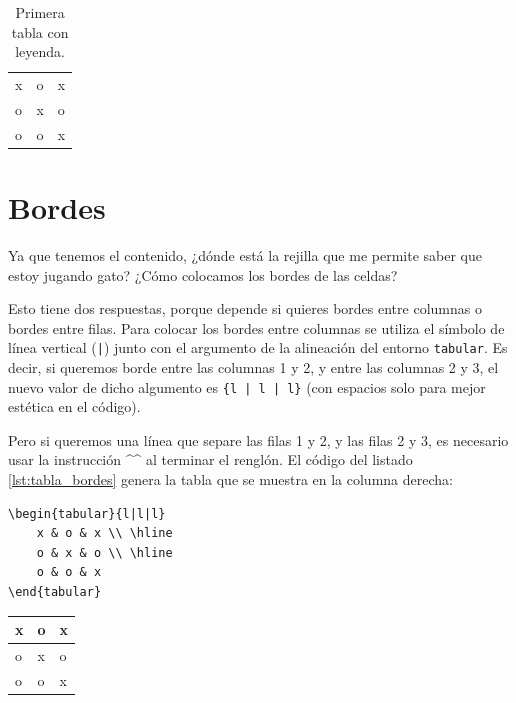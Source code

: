 \begin{table}[ht!]
	\centering
	\begin{tabular}{lll}
		x & o & x \\
		o & x & o \\
		o & o & x
	\end{tabular}
	\caption{Primera tabla con leyenda.}
	\label{tab:primera_tabla_leyenda}
\end{table}



\section{Bordes}
\label{sec:bordes}



Ya que tenemos el contenido, ¿dónde está la rejilla que me permite saber que estoy jugando gato? ¿Cómo colocamos los bordes de las celdas?

Esto tiene dos respuestas, porque depende si quieres bordes entre columnas o bordes entre filas. Para colocar los bordes entre columnas se utiliza el símbolo de línea vertical (\texttt{|}) junto con el argumento de la alineación del entorno \texttt{tabular}. Es decir, si queremos borde entre las columnas 1 y 2, y entre las columnas 2 y 3, el nuevo valor de dicho algumento es \texttt{\{l | l | l\}} (con espacios solo para mejor estética en el código).

Pero si queremos una línea que separe las filas 1 y 2, y las filas 2 y 3, es necesario usar la instrucción ^\hline^ al terminar el renglón. El código del listado \ref{lst:tabla_bordes} genera la tabla que se muestra en la columna derecha:

\noindent \begin{minipage}[ht!]{.80\linewidth}
\begin{lstlisting}[style=latex,frame={},caption={Código de tabla con bordes.},label=lst:tabla_bordes]
\begin{tabular}{l|l|l}
	x & o & x \\ \hline
	o & x & o \\ \hline
	o & o & x
\end{tabular}
\end{lstlisting}
\end{minipage}
\begin{minipage}[ht!]{.19\linewidth}
\begin{center}
	\vspace{-0.7cm}
	\begin{tabular}{l|l|l}
		x & o & x \\ \hline
		o & x & o \\ \hline
		o & o & x
	\end{tabular}
\end{center}
\end{minipage}

